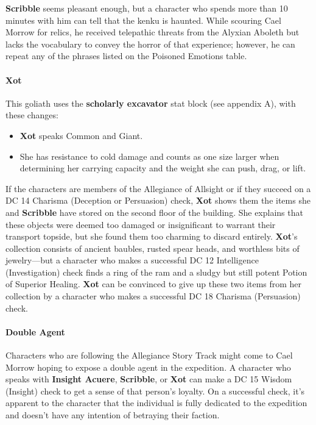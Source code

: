 \documentclass[10pt,a4,twoside,twocolumn,openany,nodeprecatedcode]{dndbook}
\begin{document}
\textbf{Scribble} seems pleasant enough, but a character who spends more than 10 minutes with him can tell that the kenku is haunted. While scouring Cael Morrow for relics, he received telepathic threats from the Alyxian Aboleth but lacks the vocabulary to convey the horror of that experience; however, he can repeat any of the phrases listed on the Poisoned Emotions table.
\paragraph{Xot}
This goliath uses the \textbf{scholarly excavator} stat block (see appendix A), with these changes:
\begin{itemize}

\item \textbf{Xot} speaks Common and Giant.
\item She has resistance to cold damage and counts as one size larger when determining her carrying capacity and the weight she can push, drag, or lift.
\end{itemize}


If the characters are members of the Allegiance of Allsight or if they succeed on a DC 14 Charisma (Deception or Persuasion) check, \textbf{Xot} shows them the items she and \textbf{Scribble} have stored on the second floor of the building. She explains that these objects were deemed too damaged or insignificant to warrant their transport topside, but she found them too charming to discard entirely.
\textbf{Xot}'s collection consists of ancient baubles, rusted spear heads, and worthless bits of jewelry—but a character who makes a successful DC 12 Intelligence (Investigation) check finds a ring of the ram and a sludgy but still potent Potion of Superior Healing. \textbf{Xot} can be convinced to give up these two items from her collection by a character who makes a successful DC 18 Charisma (Persuasion) check.
\paragraph{Double Agent}
Characters who are following the Allegiance Story Track might come to Cael Morrow hoping to expose a double agent in the expedition. A character who speaks with \textbf{Insight Acuere}, \textbf{Scribble}, or \textbf{Xot} can make a DC 15 Wisdom (Insight) check to get a sense of that person's loyalty. On a successful check, it's apparent to the character that the individual is fully dedicated to the expedition and doesn't have any intention of betraying their faction.
\end{document}
